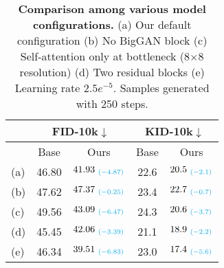 \begin{table}[]
\centering
\begin{tabular}{l|cc|cc}
\hline
                    & \multicolumn{2}{c|}{FID-10k$\downarrow$} & \multicolumn{2}{c}{KID-10k$\downarrow$} \\ \hline
       & Base     & Ours     & Base     & Ours     \\ \hline
(a)  &    46.80    &    $\text{41.93}_{~\textcolor{cyan}{(-4.87)}}$    &   22.6   &     $\text{20.5}_{~\textcolor{cyan}{(-2.1)}}$     \\
(b)  &  47.62      &   $\text{47.37}_{~\textcolor{cyan}{(-0.25)}}$      &   23.4    &  $\text{22.7}_{~\textcolor{cyan}{(-0.7)}}$        \\
(c)  &      49.56    &    $\text{43.09}_{~\textcolor{cyan}{(-6.47)}}$     &     24.3    &   $\text{20.6}_{~\textcolor{cyan}{(-3.7)}}$   \\
(d) &      45.45    &    $\text{42.06}_{~\textcolor{cyan}{(-3.39)}}$     &  21.1     &  $\text{18.9}_{~\textcolor{cyan}{(-2.2)}}$   \\
(e) &      46.34        &    $\text{39.51}_{~\textcolor{cyan}{(-6.83)}}$      &     23.0      &  $\text{17.4}_{~\textcolor{cyan}{(-5.6)}}$        \\ \hline
\end{tabular}
\caption{\textbf{Comparison among various model configurations.} (a) Our default configuration (b) No BigGAN block (c) Self-attention only at bottleneck (8$\times$8 resolution) (d) Two residual blocks (e) Learning rate $2.5e^{-5}$. Samples generated with 250 steps.}
\vspace{-1em}
\label{table:architecture}
\end{table}
